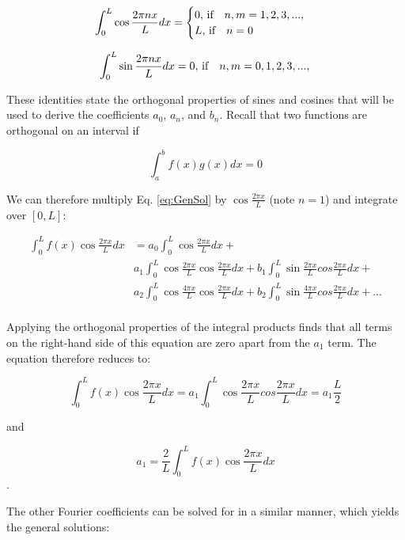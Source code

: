 \begin{equation}
\int_0^L{\cos{\frac{2 \pi n x}{L}}} dx = 
	\begin{cases}
		0, \text{\,if} \quad n,m = 1,2,3,...,\\
		L, \text{\,if} \quad n = 0\\
	\end{cases}
\end{equation}

\begin{equation}
\int_0^L{\sin{\frac{2 \pi n x}{L}}} dx = 
		0, \text{\,if} \quad n,m = 0,1,2,3,...,\\
\end{equation}
		
These identities state  the orthogonal properties of sines and cosines that will be used to derive the coefficients $a_0$, $a_n$, and $b_n$. Recall that two functions are orthogonal on an interval if 

\begin{equation}
\int_a^b f(x)g(x)dx = 0
\end{equation}

We can therefore multiply Eq. \ref{eq:GenSol} by $\cos{\frac{2 \pi x}{L}}$ (note $n = 1$) and integrate over $[0,L]$:

\begin{align}
	\int_0^L f(x)\cos{\frac{2 \pi x}{L}} dx &= a_0 \int_0^L \cos{\frac{2 \pi x}{L}} dx +\\
	&a_1 \int_0^L \cos{\frac{2 \pi x}{L}} \cos{\frac{2 \pi x}{L}} dx +b_1 \int_0^L \sin{\frac{2 \pi x}{L}} cos{\frac{2 \pi x}{L}} dx +\\
	&a_2 \int_0^L \cos{\frac{4 \pi x}{L}} \cos{\frac{2 \pi x}{L}} dx +b_2 \int_0^L \sin{\frac{4 \pi x}{L}} cos{\frac{2 \pi x}{L}} dx + ...\\
\end{align}

Applying the orthogonal properties of the integral products finds that all terms on the right-hand side of this equation are zero apart from the $a_1$ term. The equation therefore reduces to:

\begin{equation}
\int_0^L f(x)\cos{\frac{2 \pi x}{L}} dx = a_1 \int_0^L \cos{\frac{2 \pi x}{L}} cos{\frac{2 \pi x}{L}} dx= a_1\frac{L}{2}
\end{equation}

and 

\[a_1 = \frac{2}{L} \int_0^L f(x)\cos{\frac{2 \pi x}{L}} dx\].

The other Fourier coefficients can be solved for in a similar manner, which yields the general solutions:

